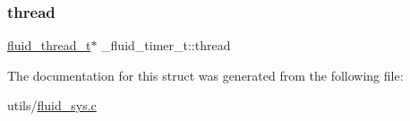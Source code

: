 \mbox{\label{struct__fluid__timer__t_a5918205c8ccfda5a441b0ad060e4cda6}} 
\subsubsection{\texorpdfstring{thread}{thread}}
{\footnotesize\ttfamily \hyperlink{fluid__sys_8h_a60a6466e68a45b0f0709f1ebaa7e6f85}{fluid\+\_\+thread\+\_\+t}$\ast$ \+\_\+fluid\+\_\+timer\+\_\+t\+::thread}



The documentation for this struct was generated from the following file\+:\begin{DoxyCompactItemize}
\item 
utils/\hyperlink{fluid__sys_8c}{fluid\+\_\+sys.\+c}\end{DoxyCompactItemize}
